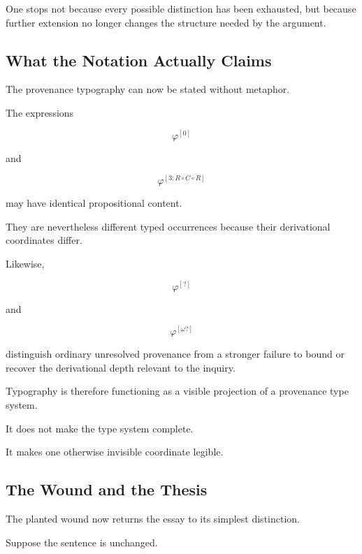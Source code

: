 \documentclass[
  11pt,
  a4paper,
  DIV=12,
  BCOR=0mm,
  parskip=half-
]{scrartcl}
\theoremstyle{definition}
\theoremstyle{plain}
\theoremstyle{remark}
\begin{document}
One stops not because every possible distinction has been exhausted, but
because further extension no longer changes the structure needed by the
argument.


\subsection{What the Notation Actually Claims}
\label{app:typographic-thesis}

The provenance typography can now be stated without metaphor.

The expressions

\[
  \varphi^{[0]}
\]

and

\[
  \varphi^{[3:R\circ C\circ R]}
\]

may have identical propositional content.

They are nevertheless different typed occurrences because their derivational
coordinates differ.

Likewise,

\[
  \varphi^{[?]}
\]

and

\[
  \varphi^{[\omega?]}
\]

distinguish ordinary unresolved provenance from a stronger failure to bound or
recover the derivational depth relevant to the inquiry.

Typography is therefore functioning as a visible projection of a provenance
type system.

It does not make the type system complete.

It makes one otherwise invisible coordinate legible.


\subsection{The Wound and the Thesis}
\label{app:wound-closure}

The planted wound now returns the essay to its simplest distinction.

Suppose the sentence is unchanged.
\end{document}
